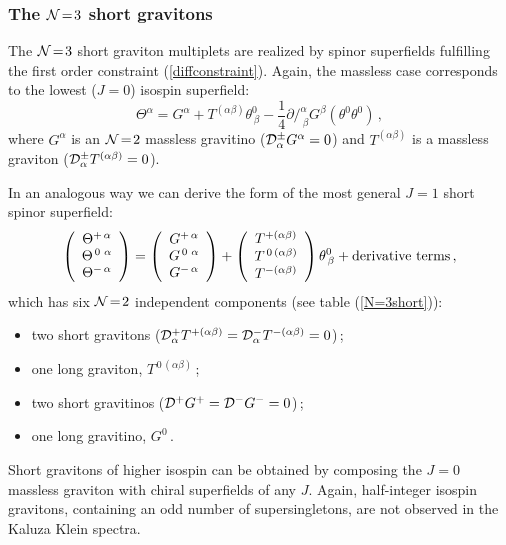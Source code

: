 \documentclass[a4paper,12pt]{article}
\newcommand{\ft}[2]{{\textstyle\frac{#1}{#2}}}
\newcommand{\eqn}[1]{(\ref{#1})}
\begin{document}
\subsubsection{The ${\cal N}\!=\!3$ short gravitons}
The ${\cal N}\!=\!3$ short graviton multiplets are realized by spinor
superfields fulfilling the first order constraint (\ref{diffconstraint}).
Again, the massless case corresponds to the lowest ($J=0$) isospin
superfield:
\begin{equation}
\Theta^\alpha=G^\alpha+T^{(\alpha\beta)}\theta^0_{\,\beta}-\ft{1}{4}
\partial\!\!\!/^\alpha_{\ \beta}G^\beta(\theta^0\theta^0)\,,
\label{J=0shgraviton}
\end{equation}
where $G^\alpha$ is an ${\cal N}\!=\!2$ massless gravitino
(${\cal D}^\pm_\alpha G^\alpha=0$) and $T^{(\alpha\beta)}$
is a massless graviton (${\cal D}^\pm_\alpha T^{(\alpha\beta)}=0$).
\par
In an analogous way we can derive the form of the most general
$J\!=\!1$ short spinor superfield:
\begin{eqnarray}
\left(\begin{array}{c}
\Theta^{+\,\alpha}\\
\Theta^{\,0\,\,\alpha}\\
\Theta^{-\,\alpha}
\end{array}\right)=
\left(\begin{array}{c}
G^{+\,\alpha}\\
G^{\,0\,\,\alpha}\\
G^{-\,\alpha}
\end{array}\right)+
\left(\begin{array}{c}
T^{+(\alpha\beta)}\\
T^{\,0\,(\alpha\beta)}\\
T^{-(\alpha\beta)}
\end{array}\right)\theta^0_{\,\beta}+{\rm derivative\ terms}\,,
\end{eqnarray}
which has six ${\cal N}\!=\!2$ independent components
(see table \eqn{N=3short}):
\begin{itemize}
\item two short gravitons
(${\cal D}^+_\alpha T^{+(\alpha\beta)}=
{\cal D}^-_\alpha T^{-(\alpha\beta)}=0$)\,;
\item one long graviton, $T^{\,0\,(\alpha\beta)}$\,;
\item two short gravitinos
(${\cal D}^+G^+={\cal D}^-G^-=0$)\,;
\item one long gravitino, $G^0$\,.
\end{itemize}
Short gravitons of higher isospin can be obtained by composing
the $J=0$ massless graviton with chiral superfields of any $J$.
Again, half-integer isospin gravitons, containing an odd number of
supersingletons, are not observed in the Kaluza Klein spectra.
\end{document}

